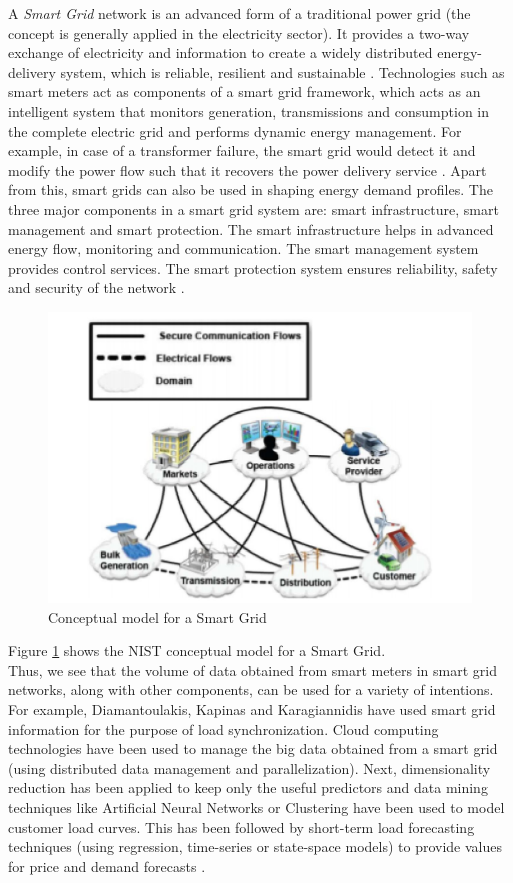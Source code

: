 A {\em Smart Grid} network is an advanced form of a traditional power grid (the concept is generally applied in the electricity sector). It provides a two-way exchange of electricity and information to create a widely distributed energy-delivery system, which is reliable, resilient and sustainable \cite{fang06}. Technologies such as smart meters act as components of a smart grid framework, which acts as an intelligent system that monitors generation, transmissions and consumption in the complete electric grid and performs dynamic energy management. For example, in case of a transformer failure, the smart grid would detect it and modify the power flow such that it recovers the power delivery service \cite{fang06}. Apart from this, smart grids can also be used in shaping energy demand profiles. The three major components in a smart grid system are: smart infrastructure, smart management and smart protection. The smart infrastructure helps in advanced energy flow, monitoring and communication. The smart management system provides control services. The smart protection system ensures reliability, safety and security of the network \cite{fang06}.
\begin{figure}
	\includegraphics[width=1.0\columnwidth]{images/smart_grid.jpg}
	\caption{Conceptual model for a Smart Grid \cite{fang06}}
	\label{F:grid}
\end{figure}
Figure \ref{F:grid} shows the NIST conceptual model for a Smart Grid.\\
Thus, we see that the volume of data obtained from smart meters in smart grid networks, along with other components, can be used for a variety of intentions. For example, Diamantoulakis, Kapinas and Karagiannidis have used smart grid information for the purpose of load synchronization. Cloud computing technologies have been used to manage the big data obtained from a smart grid (using distributed data management and parallelization). Next, dimensionality reduction has been applied to keep only the useful predictors and data mining techniques like Artificial Neural Networks or Clustering have been used to model customer load curves. This has been followed by short-term load forecasting techniques (using regression, time-series or state-space models) to provide values for price and demand forecasts \cite{george07}.
